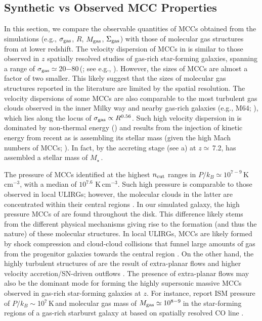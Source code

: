 \IfFileExists{emulateapjlegacy.cls}{\documentclass[iop]{emulateapjlegacy}}{\documentclass[iop]{emulateapj}}
\begin{document}
\subsection{Synthetic vs Observed MCC Properties} \label{sec:diss1}

In this section, we compare the observable quantities of MCCs obtained from the simulations (e.g., $\sigma_{\rm gas}$, $R$, $M_{\rm gas}$, $\Sigma_{\rm gas}$) with those of molecular gas structures from \obs at lower redshift.
The velocity dispersion of MCCs in \flower is similar to those observed in $z$ spatially resolved studies of gas-rich star-forming galaxies, 
spanning a range of $\sigma_{\rm gas}\simeq$\,20$-$80\,\kms (; see e.g., \citealt{Swinbank11a}). 
However, the sizes of MCCs are almost a factor of two smaller. This likely suggest that the sizes of \highz molecular gas structures reported in the literature
are limited by the spatial resolution. 
%
The velocity dispersions of some MCCs are also comparable to the most turbulent gas clouds observed in the inner Milky way and nearby gas-rich galaxies (e.g., M64; \citealt{Oka01a, Rosolowsky05a, Heyer09a, Leroy15a}), which lies along the locus of $\sigma_{\rm gas}\propto R^{0.56}$. Such high velocity dispersion 
in \flower is dominated by non-thermal energy () and results from the injection of kinetic energy from recent \SF as \flower is assembling its stellar mass (given the high Mach numbers of MCCs; ). In fact, by the accreting stage (see a) at $z\simeq$\,7.2, \flower has assembled a stellar mass of $M_\star$\,\Msun.

The pressure of MCCs identified at the highest $n_{\rm cut}$ ranges in $P/k_B\simeq10^{7-9}$\,{\rm K}\,{\rm cm}$^{-3}$, with a median of $10^{7.6}$\,\,{\rm K}\,{\rm cm}$^{-3}$. Such high pressure is comparable to those observed in local ULIRGs; however, the molecular clouds in the latter are concentrated within their central regions \citep{Downes98a, Sakamoto08a}. In our simulated galaxy, the high pressure MCCs of \flower are found throughout the disk. This difference likely stems from the different physical mechanisms giving rise to the formation (and thus the nature) of these molecular structures.
%
In local ULIRGs, MCCs are likely formed by shock compression and cloud-cloud collisions that funnel large amounts of gas from the progenitor galaxies towards the central region \citep{Tan00a, Wu18a}. On the other hand, the highly turbulent structures of \flower are the result of extra-planar flows \citep{Kohandel19a} and higher velocity accretion/SN-driven outflows \citep{Gallerani18a}. The presence of extra-planar flows may also be the dominant mode for forming the highly supersonic massive MCCs observed in gas-rich star-forming galaxies at $z$. For instance, \citet{Swinbank11a} report ISM pressure of $P/k_B\sim$10$^7$\,K\,\cc and molecular gas mass of $M_{\rm gas}\simeq10^{8-9}$\,\Msun in the star-forming regions of a gas-rich starburst galaxy at \z{} based on spatially resolved CO line \obs.
\end{document}
